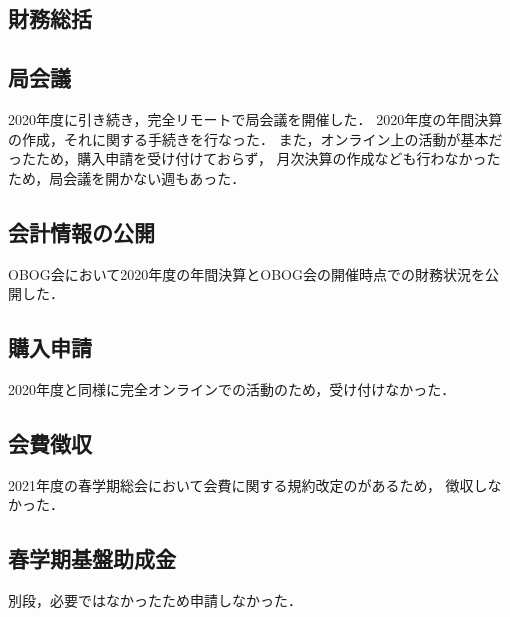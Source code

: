 \subsection*{財務総括}


\subsection*{局会議}
2020年度に引き続き，完全リモートで局会議を開催した．
2020年度の年間決算の作成，それに関する手続きを行なった．
また，オンライン上の活動が基本だったため，購入申請を受け付けておらず，
月次決算の作成なども行わなかったため，局会議を開かない週もあった．

\subsection*{会計情報の公開}
OBOG会において2020年度の年間決算とOBOG会の開催時点での財務状況を公開した．

\subsection*{購入申請}
2020年度と同様に完全オンラインでの活動のため，受け付けなかった．

\subsection*{会費徴収}
2021年度の春学期総会において会費に関する規約改定のがあるため，
徴収しなかった．

\subsection*{春学期基盤助成金}
別段，必要ではなかったため申請しなかった．

